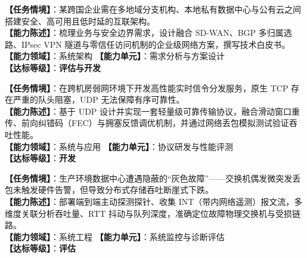 \begin{taskbox}[任务 1：企业混合云多分支网络架构设计白皮书]
\textbf{【任务情境】}：某跨国企业需在多地域分支机构、本地私有数据中心与公有云之间搭建安全、高可用且低时延的互联架构。\\
\textbf{【能力陈述】}：梳理业务与安全边界需求，设计融合 SD-WAN、BGP 多归属选路、IPsec VPN 隧道与零信任访问机制的企业级网络方案，撰写技术白皮书。\\
\textbf{【能力领域】}：系统架构 \quad \textbf{【能力单元】}：需求分析与方案设计\\
\textbf{【达标等级】}：\textbf{评估与开发}
\end{taskbox}

\begin{taskbox}[任务 2：高并发微服务场景下的自研轻量可靠传输协议]
\textbf{【任务情境】}：在跨机房弱网环境下开发高性能实时信令分发服务，原生 TCP 存在严重的队头阻塞，UDP 无法保障有序可靠性。\\
\textbf{【能力陈述】}：基于 UDP 设计并实现一套轻量级可靠传输协议，融合滑动窗口重传、前向纠错码（FEC）与拥塞反馈调优机制，并通过网络丢包模拟测试验证吞吐性能。\\
\textbf{【能力领域】}：系统与应用 \quad \textbf{【能力单元】}：协议研发与性能评测\\
\textbf{【达标等级】}：\textbf{开发}
\end{taskbox}

\begin{taskbox}[任务 3：数据中心大规模网络灰度故障与抖动诊断分析]
\textbf{【任务情境】}：生产环境数据中心遭遇隐蔽的“灰色故障”——交换机偶发微突发丢包未触发硬件告警，但导致分布式存储吞吐断崖式下跌。\\
\textbf{【能力陈述】}：部署端到端主动探测探针、收集 INT（带内网络遥测）报文流，多维度关联分析吞吐量、RTT 抖动与队列深度，准确定位故障物理交换机与受损链路。\\
\textbf{【能力领域】}：系统工程 \quad \textbf{【能力单元】}：系统监控与诊断评估\\
\textbf{【达标等级】}：\textbf{评估}
\end{taskbox}

